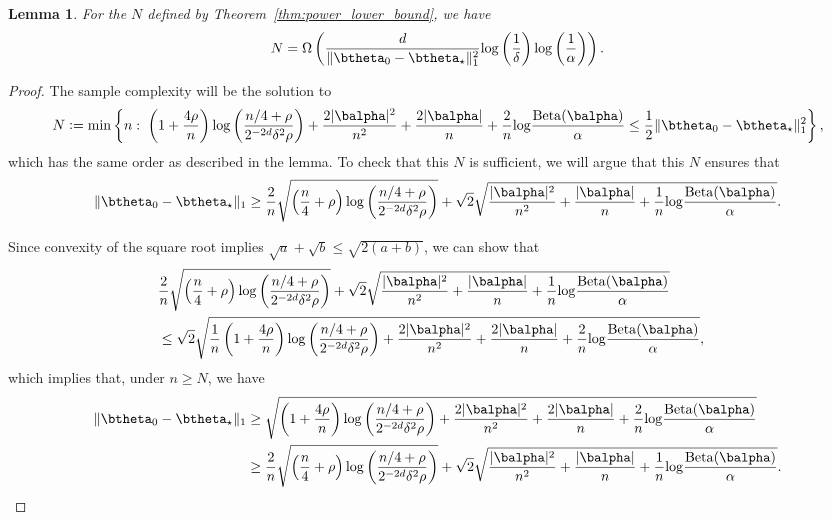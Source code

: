 \documentclass[11pt]{article}
\def\log{{\rm log}}
\newcommand{\Beta}{\mathrm{Beta}}
\newtheorem{lemma}{Lemma}[section]
\newcommand{\df}{\vcentcolon=}
\newcommand{\pfrac}[2]{\left(\frac{#1}{#2}\right)}
\begin{document}
\begin{lemma}
  For the $N$ defined by Theorem~\ref{thm:power_lower_bound}, we have
  \begin{equation*}
    N = \Omega\left(
      \frac{d}{\Vert \btheta_0- \btheta_\star\Vert_{1}^2}
\log\pfrac{1}{\delta}\log\pfrac{1}{\alpha}
    \right).
  \end{equation*}
\end{lemma}
\begin{proof}
The sample complexity will be the solution to
\[
  N \df
  \min
  \left\{
    n:\;
      \left(1 + \frac{4\rho}{n}\right)
      \log\pfrac{n/4+\rho}{2^{-2d}\delta^2 \rho}
    +
      \frac{2|\balpha|^2}{n^2} + \frac{2|\balpha|}{n}
      +
    \frac{2}{n}\log\frac{\Beta(\balpha)}{\alpha}
    \leq
    \frac{1}{2}\Vert \btheta_0- \btheta_\star\Vert_{1}^2
  \right\},
\]
  which has the same order as described in the lemma.
To check that this $N$ is sufficient, we will argue that this $N$ ensures that
  \begin{equation}\label{eqn:n.bound}
    \Vert \btheta_0- \btheta_\star\Vert_{1}
    \geq
    \frac{2}{n}\sqrt{\left(\frac{n}{4} + \rho\right)
      \log\pfrac{n/4+\rho}{2^{-2d}\delta^2 \rho}}
    + \sqrt{2}\sqrt{
      \frac{|\balpha|^2}{n^2} + \frac{|\balpha|}{n}
      +
      \frac{1}{n}\log\frac{\Beta(\balpha)}{\alpha}
    }.
\end{equation}  

Since convexity of the square root implies  $\sqrt{a}+\sqrt{b}\leq\sqrt{2(a+b)}$, we can show that
\begin{align*}
    \lefteqn{\frac{2}{n}\sqrt{\left(\frac{n}{4} + \rho\right)
      \log\pfrac{n/4+\rho}{2^{-2d}\delta^2 \rho}}
    + \sqrt{2}\sqrt{
      \frac{|\balpha|^2}{n^2} + \frac{|\balpha|}{n}
      +
      \frac{1}{n}\log\frac{\Beta(\balpha)}{\alpha}
  }}\\
  &\leq
    \sqrt{2}
      \sqrt{\frac{1}{n}\left(1 + \frac{4\rho}{n}\right)
      \log\pfrac{n/4+\rho}{2^{-2d}\delta^2 \rho}
    +
      \frac{2|\balpha|^2}{n^2} + \frac{2|\balpha|}{n}
      +
    \frac{2}{n}\log\frac{\Beta(\balpha)}{\alpha}
    },
\end{align*}
which implies that, under $n \geq N$, we have
\begin{align*}
    \Vert \btheta_0- \btheta_\star\Vert_{1}
  &\geq
    \sqrt{
    \left(1 + \frac{4\rho}{n}\right)
      \log\pfrac{n/4+\rho}{2^{-2d}\delta^2 \rho}
    +
      \frac{2|\balpha|^2}{n^2} + \frac{2|\balpha|}{n}
      +
    \frac{2}{n}\log\frac{\Beta(\balpha)}{\alpha}
    }\\
    &\geq
      \frac{2}{n}\sqrt{\left(\frac{n}{4} + \rho\right)
      \log\pfrac{n/4+\rho}{2^{-2d}\delta^2 \rho}}
    + \sqrt{2}\sqrt{
      \frac{|\balpha|^2}{n^2} + \frac{|\balpha|}{n}
      +
      \frac{1}{n}\log\frac{\Beta(\balpha)}{\alpha}
      }.
\end{align*}
\end{proof}
\end{document}
